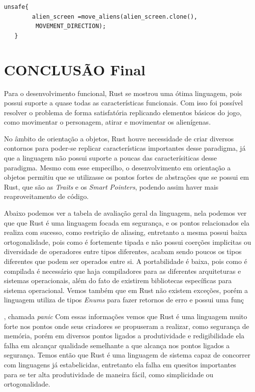 \documentclass[rel_mlp]{iiufrgs}
\begin{document}
\begin{lstlisting}[frame=single]
    unsafe{
        alien_screen =move_aliens(alien_screen.clone(),
         MOVEMENT_DIRECTION);
   }
\end{lstlisting}
 
%
\chapter{CONCLUSÃO Final}
Para o desenvolvimento funcional, Rust se mostrou uma ótima linguagem, pois possui suporte a quase todas as características funcionais. Com isso foi possível resolver o problema de forma satisfatória replicando elementos básicos do jogo, como movimentar o personagem, atirar e movimentar os alienígenas. 


No âmbito de orientação a objetos, Rust houve necessidade de criar diversos contornos para poder-se replicar características importantes desse paradigma, já que a linguagem não possui suporte a poucas das caracterísiticas desse paradigma. Mesmo com esse empecilho, o desenvolvimento em orientação a objetos permitiu que se utilizasse os pontos fortes de abstrações que se possui em Rust, que são as \textit{Traits} e os \textit{Smart Pointers}, podendo assim haver mais reaproveitamento de código.

Abaixo podemos ver a tabela de avaliação geral da linguagem, nela podemos ver que que Rust é uma linguagem focada em segurança,  e os pontos relacionados  ela realiza com sucesso, como restrição de aliasing, entretanto a mesma possui baixa ortogonalidade, pois como é fortemente tipada e não possui coerções implicitas ou diversidade de operadores entre tipos diferentes, acabam sendo poucos os tipos diferentes que podem ser operados entre si. A portabilidade é baixa, pois como é compilada é necessário que haja compiladores para as diferentes arquiteturas e sistemas operacionais, além do fato de existirem bibliotecas específicas para sistema operacional. Vemos também que em Rust não existem exceções, porém a linguagem utiliza de tipos \textit{Enums} para fazer retornos de erro e possui uma funç

, chamada \textit{panic}%
Com essas informações vemos que Rust é uma linguagem muito forte nos pontos onde seus criadores se propuseram a realizar, como segurança de memória, porém em diversos pontos ligados a produtividade e redigibilidade ela falha em alcançar qualidade semelhante a que alcança nos pontos ligados a segurança. Temos então que Rust é uma linguagem de sistema capaz de concorrer com linguagens já estabelicidas, entretanto ela falha em quesitos importantes para se ter alta produtividade de maneira fácil, como simplicidade ou ortogonalidade.
\end{document}
